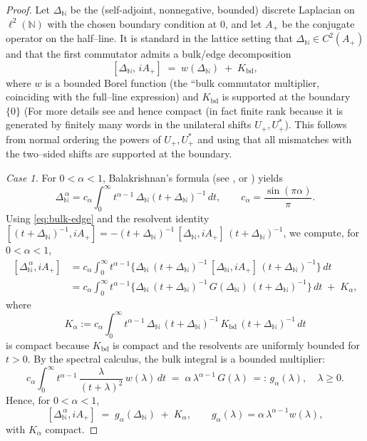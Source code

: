 \documentclass[10pt]{amsart}
\newcommand{\N}{{\mathbb{N}}}
\newcommand{\1}{{\mathbb{I}}}
\numberwithin{equation}{section}
\begin{document}
\begin{proof}
Let $\Delta_{\N}$ be the (self-adjoint, nonnegative, bounded) discrete Laplacian
on $\ell^2(\N)$ with the chosen boundary condition at $0$, and let $A_+$ be the
conjugate operator on the half--line. It is standard in the lattice setting that
$\Delta_{\N}\in C^2(A_+)$ and that the first commutator admits a bulk/edge
decomposition
\begin{equation}\label{eq:bulk-edge}
[\Delta_{\N},\,iA_+] \;=\; w(\Delta_{\N}) \;+\; K_{\mathrm{bd}},
\end{equation}
where $w$ is a bounded Borel function (the ``bulk commutator multiplier,
coinciding with the full--line expression) and $K_{\mathrm{bd}}$ is supported at
the boundary $\{0\}$ (For more details see \cite{Mic, AEG} and hence compact (in fact finite rank because it is
generated by finitely many words in the unilateral shifts $U_+,U_+^*$).  This
follows from normal ordering the powers of $U_+,U_+^*$ and using that all
mismatches with the two--sided shifts are supported at the boundary.

\smallskip
\emph{Case 1.}
For $0<\alpha<1$, Balakrishnan's formula (see \cite{Balakrishnan1960}, or
\cite[Chap.~3]{Davies1995}) yields
\[
\Delta_{\N}^{\,\alpha}
= c_\alpha \int_0^\infty t^{\alpha-1}\, \Delta_{\N}(t+\Delta_{\N})^{-1}\,dt,
\qquad c_\alpha=\frac{\sin(\pi\alpha)}{\pi}.
\]
Using \eqref{eq:bulk-edge} and the resolvent identity
$[(t+\Delta_{\N})^{-1},iA_+]=-(t+\Delta_{\N})^{-1}\,[\Delta_{\N},iA_+]\, (t+\Delta_{\N})^{-1}$,
we compute, for $0<\alpha<1$,
\[
\begin{aligned}
[\Delta_{\N}^{\,\alpha},iA_+]
&= c_\alpha \int_0^\infty t^{\alpha-1}
\Big\{ \Delta_{\N}\,(t+\Delta_{\N})^{-1}\,[\Delta_{\N},iA_+]\, (t+\Delta_{\N})^{-1} \Big\}\,dt \\
&= c_\alpha \int_0^\infty t^{\alpha-1}
\Big\{ \Delta_{\N}\,(t+\Delta_{\N})^{-1}\,G(\Delta_{\N})\, (t+\Delta_{\N})^{-1} \Big\}\,dt
\;+\; K_\alpha,
\end{aligned}
\]
where
\[
K_\alpha:= c_\alpha \int_0^\infty t^{\alpha-1}
\,\Delta_{\N}\,(t+\Delta_{\N})^{-1}\,K_{\mathrm{bd}}\,(t+\Delta_{\N})^{-1}\,dt
\]
is compact because $K_{\mathrm{bd}}$ is compact and the resolvents are uniformly
bounded for $t>0$. By the spectral calculus, the bulk integral is a bounded
multiplier:
\[
c_\alpha \int_0^\infty t^{\alpha-1}\,\frac{\lambda}{(t+\lambda)^2}\,w(\lambda)\,dt
\;=\; \alpha\,\lambda^{\alpha-1}\,G(\lambda)\,=:\,g_\alpha(\lambda),
\quad \lambda\ge0.
\]
Hence, for $0<\alpha<1$,
\begin{equation}\label{eq:comm-alpha}
[\Delta_{\N}^{\,\alpha},iA_+] \;=\; g_\alpha(\Delta_{\N}) \;+\; K_\alpha,
\qquad g_\alpha(\lambda)=\alpha\,\lambda^{\alpha-1}w(\lambda),
\end{equation}
with $K_\alpha$ compact.


\end{proof}
\end{document}
